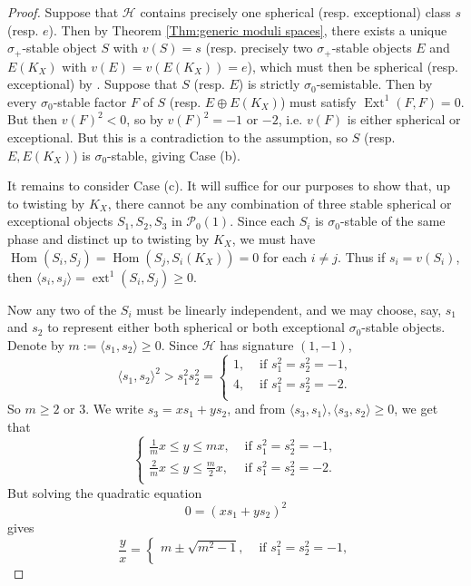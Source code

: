 \documentclass[leqno,11pt]{amsart}
\def\Ext{\mathop{\mathrm{Ext}}\nolimits}
\def\ext{\mathop{\mathrm{ext}}\nolimits}
\def\Hom{\mathop{\mathrm{Hom}}\nolimits}
\theoremstyle{definition}
\def\HH{\ensuremath{\mathcal H}}
\def\PP{\ensuremath{\mathcal P}}
\begin{document}
\begin{proof}
Suppose that $\HH$ contains precisely one spherical (resp. exceptional) class $s$ (resp. $e$).  Then by Theorem \ref{Thm:generic moduli spaces}, there exists a unique $\sigma_+$-stable object $S$ with $v(S)=s$ (resp. precisely two $\sigma_+$-stable objects $E$ and $E(K_X)$ with $v(E)=v(E(K_X))=e$), which must then be spherical (resp. exceptional) by \cite[Lemma 4.3]{Yos16b}.  Suppose that $S$ (resp. $E$) is strictly $\sigma_0$-semistable.  Then by \cite[Lemma 4.6]{Yos16b} every $\sigma_0$-stable factor $F$ of $S$ (resp. $E\oplus E(K_X)$) must satisfy $\Ext^1(F,F)=0$.  But then $v(F)^2<0$, so by \cite[Lemma 4.3]{Yos16b} $v(F)^2=-1$ or $-2$, i.e. $v(F)$ is either spherical or exceptional.  But this is a contradiction to the assumption, so $S$ (resp. $E,E(K_X)$) is $\sigma_0$-stable, giving Case (b).

It remains to consider Case (c).  It will suffice for our purposes to show that, up to twisting by $K_X$, there cannot be any combination of three stable spherical or exceptional objects $S_1,S_2,S_3$ in $\PP_0(1)$.  Since each $S_i$ is $\sigma_0$-stable of the same phase and distinct up to twisting by $K_X$, we must have $\Hom(S_i,S_j)=\Hom(S_j,S_i(K_X))=0$ for each $i\neq j$.  Thus if $s_i=v(S_i)$, then $\langle s_i,s_j\rangle=\ext^1(S_i,S_j)\geq 0$.

Now any two of the $S_i$ must be linearly independent, and we may choose, say, $s_1$ and $s_2$ to represent either both spherical or both exceptional $\sigma_0$-stable objects.    Denote by $m:=\langle s_1,s_2\rangle\geq 0$.  Since $\HH$ has signature $(1,-1)$, $$\langle s_1,s_2\rangle^2> s_1^2s_2^2=\begin{cases}
1, & \text{ if }s_1^2=s_2^2=-1,\\

4, & \text{ if }s_1^2=s_2^2=-2.\\
\end{cases}$$
So $m\geq 2$ or $3$.  We write $s_3=xs_1+ys_2$, and from $\langle s_3,s_1\rangle,\langle s_3,s_2\rangle\geq 0$, we get that \begin{equation}\label{eq:positivity}\begin{cases}
\frac{1}{m}x\leq y\leq mx, & \text{ if }s_1^2=s_2^2=-1,\\

\frac{2}{m}x\leq y\leq \frac{m}{2}x, & \text{ if }s_1^2=s_2^2=-2.\\  
\end{cases}\end{equation}  But solving the quadratic equation $$0=(xs_1+ys_2)^2$$ gives \begin{equation}\label{eq:isotropic solutions}\frac{y}{x}=\begin{cases}
m\pm\sqrt{m^2-1}, & \text{ if }s_1^2=s_2^2=-1,\\


\end{cases}
\end{equation}
\end{proof}
\end{document}
